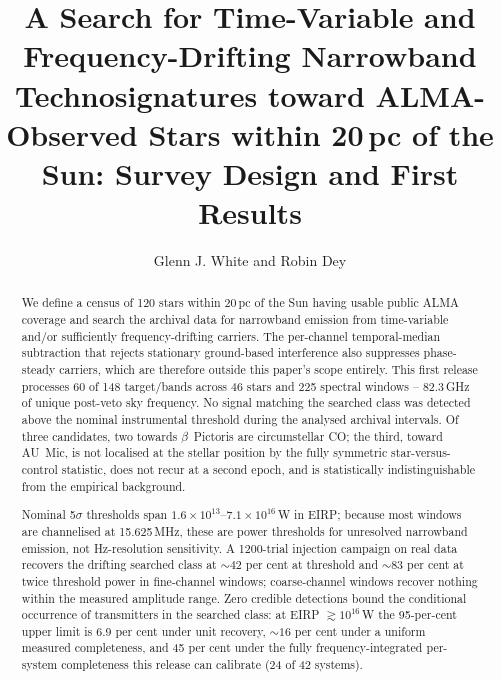 \documentclass{openjournal}
\begin{document}
\title{A Search for Time-Variable and Frequency-Drifting Narrowband
Technosignatures toward ALMA-Observed Stars within 20\,pc of the Sun:
Survey Design and First Results}

\author{Glenn J. White and Robin Dey}

\begin{abstract}
We define a census of 120 stars within 20\,pc of the Sun having usable
public ALMA coverage and search the archival data for narrowband
emission from time-variable and/or sufficiently frequency-drifting
carriers. The per-channel temporal-median subtraction that rejects
stationary ground-based interference also suppresses phase-steady
carriers, which are therefore outside this paper's scope entirely.
This first release processes 60 of 148 target/bands across 46 stars
and 225 spectral windows -- 82.3\,GHz of unique post-veto sky
frequency. No signal matching the searched class was detected above
the nominal instrumental threshold during the analysed archival
intervals. Of three candidates, two towards $\beta$~Pictoris are
circumstellar CO; the third, toward AU~Mic, is not localised at the
stellar position by the fully symmetric star-versus-control
statistic, does not recur at a second epoch, and is statistically
indistinguishable from the empirical background.

Nominal 5$\sigma$ thresholds span $1.6\times10^{13}$--$7.1\times
10^{16}$\,W in EIRP; because most windows are channelised at
15.625\,MHz, these are power thresholds for unresolved narrowband
emission, not Hz-resolution sensitivity. A 1200-trial injection
campaign on real data recovers the drifting searched class at
${\sim}42$ per cent at threshold and ${\sim}83$ per cent at twice
threshold power in fine-channel windows; coarse-channel windows
recover nothing within the measured amplitude range. Zero credible
detections bound the conditional occurrence of transmitters in the
searched class: at EIRP $\gtrsim 10^{16}$\,W the 95-per-cent upper
limit is 6.9 per cent under unit recovery, ${\sim}16$ per cent under
a uniform measured completeness, and 45 per cent under the fully
frequency-integrated per-system completeness this release can
calibrate (24 of 42 systems).
\end{abstract}
\end{document}
